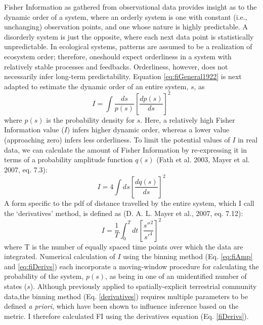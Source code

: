 \documentclass[12pt,twoside,openany]{reedthesis}
\begin{document}
Fisher Information as gathered from observational data provides insight
as to the dynamic order of a system, where an orderly system is one with
constant (i.e., unchanging) observation points, and one whose nature is
highly predictable. A disorderly system is just the opposite, where each
next data point is statistically unpredictable. In ecological systems,
patterns are assumed to be a realization of ecosystem order; therefore,
oneshould expect orderliness in a system with relatively stable
processes and feedbacks. Orderliness, however, does not necessarily
infer long-term predictability. Equation \eqref{eq:fiGeneral1922} is next
adapted to estimate the dynamic order of an entire system, \(s\), as
\begin{equation} 
  I = \int \frac{ds}{p(s)}\left[\frac{dp(s)}{ds}\right]^2
\end{equation}
where \(p(s)\) is the probability density for \(s\). Here, a relatively
high Fisher Information value (\(I\)) infers higher dynamic order,
whereas a lower value (approaching zero) infers less orderliness. To
limit the potential values of \(I\) in real data, we can calculate the
amount of Fisher Information by re-expressing it in terms of a
probability amplitude function \(q(s)\) (Fath et al. 2003, Mayer et al.
2007, eq. 7.3):
\begin{equation}
  I = 4 \int ds\left[\frac{dq(s)}{ds}\right]^2
  \label{eq:fiAmp}
\end{equation}
A form specific to the pdf of distance travelled by the entire system,
which I call the `derivatives' method, is defined as (D. A. L. Mayer et
al., 2007, eq. 7.12):
\begin{equation}
  I = \frac{1}{T} \int_0^T dt\left[\frac{s''^2}{s'^4}\right]^2
  \label{eq:fiDerivs}
\end{equation}
where T is the number of equally spaced time points over which the data
are integrated. Numerical calculation of \(I\) using the binning method
(Eq. \eqref{eq:fiAmp} and \eqref{eq:fiDerivs}) each incorporate a
moving-window procedure for calculating the probability of the system,
\(p(s)\), as being in one of an unidentified number of states (\(s\)).
Although previously applied to spatially-explicit terrestrial community
data,the binning method (Eq. \ref{derivatives}) requires multiple
parameters to be defined \emph{a priori}, which have been shown to
influence inference based on the metric. I therefore calculated FI using
the derivatives equation (Eq. \ref{fiDerivs}).
\end{document}
